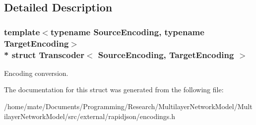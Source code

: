 \subsection{Detailed Description}
\subsubsection*{template$<$typename Source\+Encoding, typename Target\+Encoding$>$\\*
struct Transcoder$<$ Source\+Encoding, Target\+Encoding $>$}

Encoding conversion. 

The documentation for this struct was generated from the following file\+:\begin{DoxyCompactItemize}
\item 
/home/mate/\+Documents/\+Programming/\+Research/\+Multilayer\+Network\+Model/\+Multilayer\+Network\+Model/src/external/rapidjson/encodings.\+h\end{DoxyCompactItemize}
